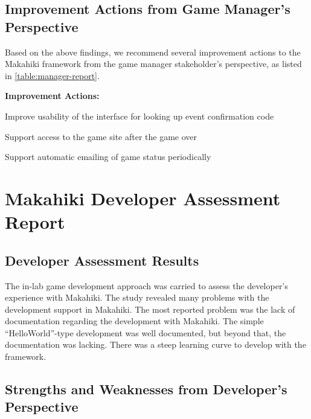 \subsection{Improvement Actions from Game Manager's Perspective}

Based on the above findings, we recommend several improvement actions to the Makahiki framework from the game manager stakeholder's perspective, as listed in \autoref{table:manager-report}.
     
\begin{table}[ht!]
\begin{shadebox}
{\bf Improvement Actions:}
	\begin{compactenum}
	\item Improve usability of the interface for looking up event confirmation code
	\item Support access to the game site after the game over
	\item Support automatic emailing of game status periodically
	\end{compactenum}
\end{shadebox}
\caption{SGSEAM Improvement Action Report from Game Manager Stakeholder's Perspective}
\label{table:manager-report}
\end{table}

\section{Makahiki Developer Assessment Report}

\subsection{Developer Assessment Results}

The in-lab game development approach was carried to assess the developer's experience with Makahiki. The study revealed many problems with the development support in Makahiki. The most reported problem was the lack of documentation regarding the development with Makahiki. The simple ``HelloWorld''-type development was well documented, but beyond that, the documentation was lacking. There was a steep learning curve to develop with the framework.

\subsection{Strengths and Weaknesses from Developer's Perspective}
    
